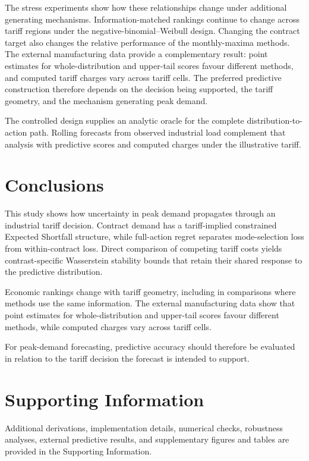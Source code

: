\documentclass[suppldata]{interact}
\begin{document}
The stress experiments show how these relationships change under
additional generating mechanisms. Information-matched rankings continue to
change across tariff regions under the negative-binomial--Weibull
design. Changing the contract target also changes the
relative performance of the monthly-maxima methods. The external
manufacturing data provide a complementary result: point estimates for
whole-distribution and upper-tail scores favour different methods, and
computed tariff charges vary across tariff cells. The preferred predictive construction
therefore depends on the decision being supported, the tariff geometry,
and the mechanism generating peak demand.

The controlled design supplies an analytic oracle for the complete
distribution-to-action path. Rolling forecasts from observed industrial
load complement that analysis with predictive scores and computed charges under the illustrative tariff.

\section{Conclusions}
\label{sec:conclusions}

This study shows how uncertainty in peak demand propagates through an
industrial tariff decision. Contract demand has a tariff-implied
constrained Expected Shortfall structure, while full-action regret
separates mode-selection loss from within-contract loss. Direct
comparison of competing tariff costs yields contrast-specific
Wasserstein stability bounds that retain their shared response to the
predictive distribution.

Economic rankings change with tariff geometry, including in
comparisons where methods use the same information. The external
manufacturing data show that point estimates for whole-distribution and
upper-tail scores favour different methods, while computed charges
vary across tariff cells.

For peak-demand forecasting, predictive accuracy should therefore
be evaluated in relation to the tariff decision the forecast is
intended to support.

\section*{Supporting Information}
Additional derivations, implementation details, numerical checks,
robustness analyses, external predictive results, and supplementary
figures and tables are provided in the Supporting Information.
\end{document}
